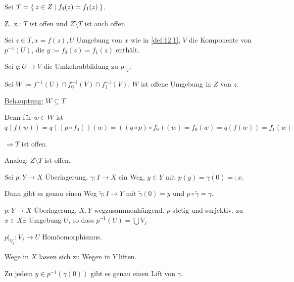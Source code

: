 %     

\begin{beweis}
    Sei $T = \Set{z \in Z | f_0(z) = f_1(z)}$.

    \underline{Z.~z.}: $T$ ist offen und $Z \setminus T$ ist auch offen.

    Sei $z \in T, x = f(z), U$ Umgebung von $x$ wie in \cref{def:12.1},
    $V$ die Komponente von $p^{-1}(U)$, die $y:=f_0(z) = f_1(z)$
    enthält.

    Sei $q:U \rightarrow V$ die Umkehrabbildung zu $p|_V$.

    Sei $W:= f^{-1}(U) \cap f_0^{-1}(V) \cap f_1^{-1}(V)$. $W$ ist 
    offene Umgebung in $Z$ von $z$.

    \underline{Behauptung:} $W \subseteq T$

    Denn für $w \in W$ ist $q(f(w)) = q((p \circ f_0))(w) = ((q \circ p) \circ f_0) (w) = f_0(w) = q(f(w)) = f_1(w)$

    $\Rightarrow T$ ist offen.

    Analog: $Z \setminus T$ ist offen.
\end{beweis}

\begin{satz}\label{thm:ueberlagerung-weg-satz-12.6}
    Sei $p: Y \rightarrow X$ Überlagerung, $\gamma: I \rightarrow X$
    ein Weg, $y \in Y$ mit $p(y) = \gamma(0) =: x$.

    Dann gibt es genau einen Weg $\tilde{\gamma}: I \rightarrow Y$
    mit $\tilde{\gamma}(0)=y$ und $p \circ \tilde{\gamma} = \gamma$.
\end{satz}

$p:Y \rightarrow X$ Überlagerung, $X,Y$ wegzusammenhängend.
$p$ stetig und surjektiv, zu $x \in X \exists$ Umgebung $U$, so dass
$p^{-1}(U) = \bigcup V_j$

$p|_{V_j}: V_j \rightarrow U$ Homöomorphismus.

\begin{bemerkung}%
    Wege in $X$ lassen sich zu Wegen in $Y$ liften.

    Zu jedem $y \in p^{-1}(\gamma(0))$ gibt es genau einen Lift von 
    $\gamma$.
\end{bemerkung}

